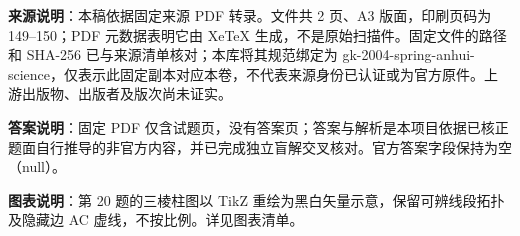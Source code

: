 


\begin{gktip}
\textbf{来源说明}：本稿依据固定来源 PDF 转录。文件共 2 页、A3 版面，印刷页码为 149–150；PDF 元数据表明它由 XeTeX 生成，不是原始扫描件。固定文件的路径和 SHA-256 已与来源清单核对；本库将其规范绑定为 gk-2004-spring-anhui-science，仅表示此固定副本对应本卷，不代表来源身份已认证或为官方原件。上游出版物、出版者及版次尚未证实。

\textbf{答案说明}：固定 PDF 仅含试题页，没有答案页；答案与解析是本项目依据已核正题面自行推导的非官方内容，并已完成独立盲解交叉核对。官方答案字段保持为空（null）。

\textbf{图表说明}：第 20 题的三棱柱图以 TikZ 重绘为黑白矢量示意，保留可辨线段拓扑及隐藏边 AC 虚线，不按比例。详见图表清单。
\end{gktip}


